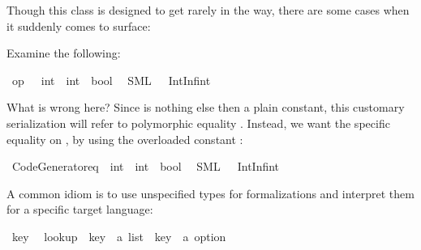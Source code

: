 \begin{isabellebody}
\begin{isamarkuptext}
  Though this class is designed to get rarely in the way, there
  are some cases when it suddenly comes to surface:%
\end{isamarkuptext}%
\isamarkuptrue%
%
\isamarkuptrue%
%
\begin{isamarkuptext}%
Examine the following:%
\end{isamarkuptext}%
\isamarkuptrue%
%
\isadelimtt
%
\endisadelimtt
%
\isatagtt
{}\isamarkupfalse%
\ {\isachardoublequoteopen}op\ {\isacharequal}\ {\isasymColon}\ int\ {\isasymRightarrow}\ int\ {\isasymRightarrow}\ bool{\isachardoublequoteclose}\isanewline
\ \ {\isacharparenleft}SML\ {\isachardoublequoteopen}{\isacharbang}{\isacharparenleft}{\isacharunderscore}\ {\isacharcolon}\ IntInf{\isachardot}int\ {\isacharequal}\ {\isacharunderscore}{\isacharparenright}{\isachardoublequoteclose}{\isacharparenright}%
\endisatagtt
{\isafoldtt}%
%
\isadelimtt
%
\endisadelimtt
%
\begin{isamarkuptext}%
What is wrong here? Since  is nothing else then
  a plain constant, this customary serialization will refer
  to polymorphic equality .
  Instead, we want the specific equality on ,
  by using the overloaded constant :%
\end{isamarkuptext}%
\isamarkuptrue%
%
\isadelimtt
%
\endisadelimtt
%
\isatagtt
{}\isamarkupfalse%
\ {\isachardoublequoteopen}Code{\isacharunderscore}Generator{\isachardot}eq\ {\isasymColon}\ int\ {\isasymRightarrow}\ int\ {\isasymRightarrow}\ bool{\isachardoublequoteclose}\isanewline
\ \ {\isacharparenleft}SML\ {\isachardoublequoteopen}{\isacharbang}{\isacharparenleft}{\isacharunderscore}\ {\isacharcolon}\ IntInf{\isachardot}int\ {\isacharequal}\ {\isacharunderscore}{\isacharparenright}{\isachardoublequoteclose}{\isacharparenright}%
\endisatagtt
{\isafoldtt}%
%
\isadelimtt
%
\endisadelimtt
%
\isamarkuptrue%
%
\begin{isamarkuptext}%
A common idiom is to use unspecified types for formalizations
  and interpret them for a specific target language:%
\end{isamarkuptext}%
\isamarkuptrue%
\isamarkupfalse%
\ key\isanewline
\isanewline
{}\isamarkupfalse%
\isanewline
\ \ lookup\ {\isacharcolon}{\isacharcolon}\ {\isachardoublequoteopen}{\isacharparenleft}key\ {\isasymtimes}\ {\isacharprime}a{\isacharparenright}\ list\ {\isasymRightarrow}\ key\ {\isasymRightarrow}\ {\isacharprime}a\ option{\isachardoublequoteclose}\ \isanewline

\end{isabellebody}
